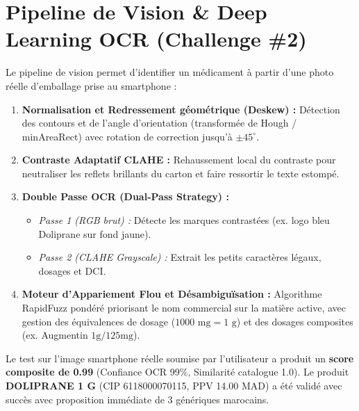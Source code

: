 \documentclass[a4paper,10pt]{article}
\begin{document}
\section{Pipeline de Vision \& Deep Learning OCR (Challenge \#2)}

Le pipeline de vision permet d'identifier un médicament à partir d'une photo réelle d'emballage prise au smartphone :

\begin{enumerate}[leftmargin=*]
    \item \textbf{Normalisation et Redressement géométrique (Deskew) :} Détection des contours et de l'angle d'orientation (transformée de Hough / minAreaRect) avec rotation de correction jusqu'à $\pm 45^\circ$.
    \item \textbf{Contraste Adaptatif CLAHE :} Rehaussement local du contraste pour neutraliser les reflets brillants du carton et faire ressortir le texte estompé.
    \item \textbf{Double Passe OCR (Dual-Pass Strategy) :}
    \begin{itemize}
        \item \textit{Passe 1 (RGB brut) :} Détecte les marques contrastées (ex. logo bleu Doliprane sur fond jaune).
        \item \textit{Passe 2 (CLAHE Grayscale) :} Extrait les petits caractères légaux, dosages et DCI.
    \end{itemize}
    \item \textbf{Moteur d'Appariement Flou et Désambiguïsation :}
    Algorithme RapidFuzz pondéré priorisant le nom commercial sur la matière active, avec gestion des équivalences de dosage ($1000\text{ mg} = 1\text{ g}$) et des dosages composites (ex. Augmentin $1\text{g} / 125\text{mg}$).
\end{enumerate}

\begin{tcolorbox}[colback=lightbg,colframe=primary,arc=1mm,title={\small \textbf{Validation sur Photo Réelle de Doliprane 1000 mg}}]
\footnotesize
Le test sur l'image smartphone réelle soumise par l'utilisateur a produit un \textbf{score composite de 0.99} (Confiance OCR 99\%, Similarité catalogue 1.0). Le produit \textbf{DOLIPRANE 1 G} (CIP 6118000070115, PPV 14.00 MAD) a été validé avec succès avec proposition immédiate de 3 génériques marocains.
\end{tcolorbox}
\end{document}
